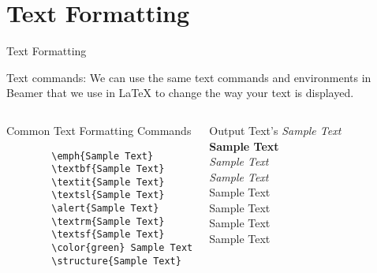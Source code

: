 \documentclass[10pt,xcolor=x11names]{beamer}
\begin{document}
\section{Text Formatting}
\begin{frame}[fragile]{Text Formatting} \vspace{-5pt}
\begin{exampleblock}{Text commands:}
We can use the same text commands and environments in Beamer that we use in {\LaTeX} to change the way your text is displayed.
\end{exampleblock}
\begin{columns}[t]
{\small	{}	
	\begin{block}{Common Text Formatting Commands}
		\begin{verbatim}
		\emph{Sample Text}
		\textbf{Sample Text}
		\textit{Sample Text}
		\textsl{Sample Text}
		\alert{Sample Text}
		\textrm{Sample Text}
		\textsf{Sample Text}
		\color{green} Sample Text
		\structure{Sample Text}
		\end{verbatim}	
	\end{block}}
	\begin{block}{Output Text's}
		\emph{Sample Text}\\
		\textbf{Sample Text}\\
		\textit{Sample Text}\\
		\textsl{Sample Text}\\
		\alert{Sample Text}\\
		\textrm{Sample Text}\\
		\textsf{Sample Text}\\
		\color{green} Sample Text\\
		\\
	\end{block}
\end{columns}
\end{frame}
\end{document}
